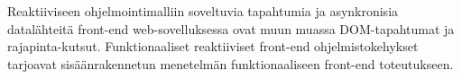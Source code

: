 Reaktiiviseen ohjelmointimalliin soveltuvia tapahtumia ja asynkronisia datalähteitä front-end web-sovelluksessa ovat
muun muassa DOM-tapahtumat ja rajapinta-kutsut. Funktionaaliset reaktiiviset front-end ohjelmistokehykset tarjoavat
sisäänrakennetun menetelmän funktionaaliseen front-end toteutukseen. \cite{elmlang}\cite{reactjs}
